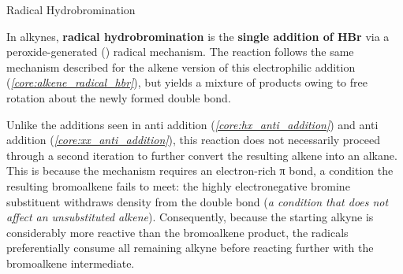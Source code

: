\documentclass[10pt]{article}
\begin{document}
      \begin{core}{Radical Hydrobromination}

        In alkynes, \textbf{radical hydrobromination} is the \textbf{single addition of HBr} via a peroxide-generated () radical mechanism. The reaction follows the same mechanism described for the alkene version of this electrophilic addition (\textit{\autoref{core:alkene_radical_hbr}}), but yields a mixture of products owing to free rotation about the newly formed double bond.


        Unlike the additions seen in  anti addition (\textit{\autoref{core:hx_anti_addition}}) and  anti addition (\textit{\autoref{core:xx_anti_addition}}), this reaction does not necessarily proceed through a second iteration to further convert the resulting alkene into an alkane. This is because the mechanism requires an electron-rich π bond, a condition the resulting bromoalkene fails to meet: the highly electronegative bromine substituent withdraws  density from the double bond (\textit{a condition that does not affect an unsubstituted alkene}). Consequently, because the starting alkyne is considerably more reactive than the bromoalkene product, the radicals preferentially consume all remaining alkyne before reacting further with the bromoalkene intermediate.


\end{core}
\end{document}
